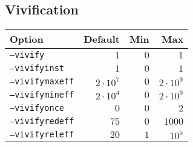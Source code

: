 \documentclass{article}
\begin{document}
\subsection{Vivification}
\begin{tabular}{l|rrr}
    Option & Default & Min & Max \\
    \hline
    \texttt{--vivify}       & $1$    & $0$  & $1$ \\
    \texttt{--vivifyinst}   & $1$    & $0$  & $1$ \\
    \texttt{--vivifymaxeff} & $2 \cdot 10^7$ & $0$  & $2 \cdot 10^9$ \\
    \texttt{--vivifymineff} & $2 \cdot 10^4$ & $0$  & $2 \cdot 10^9$ \\
    \texttt{--vivifyonce}   & $0$    & $0$  & $2$ \\
    \texttt{--vivifyredeff} & $75$   & $0$  & $1000$ \\
    \texttt{--vivifyreleff} & $20$   & $1$  & $10^5$ \\
\end{tabular}
\end{document}
